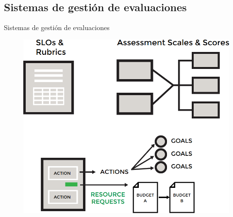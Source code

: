 \documentclass[10pt,xcolor=table ]{beamer}
\begin{document}
\subsection{Sistemas de gestión de evaluaciones}
\begin{frame}{Sistemas de gestión de evaluaciones}
	\begin{figure}
		\centering
	    \includegraphics[scale=0.55]{../Figuras/ams}
	\end{figure}
\end{frame}
\end{document}

